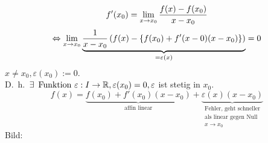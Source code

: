 \documentclass[../ana1.tex]{subfiles}
\begin{document}
\begin{bem}
    \[ f'(x_0) = \lim\limits_{x\rightarrow x_0} \frac{f(x) - f(x_0)}{ x - x_0 } \]
    \[ \Leftrightarrow \lim\limits_{x\rightarrow x_0} \underbrace{ \frac{1}{x - x_0} \left(
        f(x) - \{ f(x_0) + f'(x-0)(x-x_0) \} \right) 
    }_{=\varepsilon(x)} = 0 \]
    \( x \neq x_0, \varepsilon(x_0) := 0 \).\\
    D.\ h.\  \( \exists \, \text{ Funktion } 
    \varepsilon : I \rightarrow \mathbb{R}, \varepsilon (x_0) = 0, \varepsilon \) 
    ist stetig in \(x_0\).
    \[ f(x) = \underbrace{f(x_0) + f'(x_0)(x - x_0)}_{
        \text{affin linear}
    } + \underbrace{\varepsilon(x)(x - x_0)}_{\substack{
        \text{Fehler, geht schneller}\\\text{als linear gegen Null}\\
        x \rightarrow x_0}} \]
    Bild:
    \begin{center}
    \end{center}
\end{bem}
\end{document}

